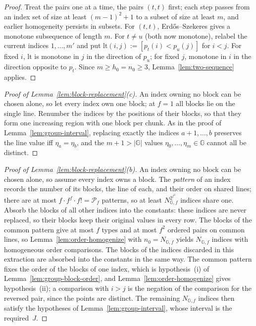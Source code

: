 \documentclass[11pt]{article}
\numberwithin{equation}{section}
\theoremstyle{plain}
\theoremstyle{definition}
\theoremstyle{remark}
\theoremstyle{plain}
\begin{document}
\begin{proof}
Treat the pairs one at a time, the pairs $(t,t)$ first; each step passes from an
index set of size at least $(m-1)^2+1$ to a subset of size at least $m$, and earlier
homogeneity persists in subsets.  For $(t,t)$, Erd\H{o}s--Szekeres gives a monotone
subsequence of length $m$.  For $t\ne u$ (both now monotone), relabel the current
indices $1,\ldots,m'$ and put $\mathrm{lt}(i,j):=[p_t(i)<p_u(j)]$ for $i<j$.  For fixed $i$,
$\mathrm{lt}$ is monotone in $j$ in the direction of $p_u$; for fixed $j$, monotone in $i$ in
the direction opposite to $p_t$.  Since $m\ge h_0=n_0\ge3$,
Lemma~\ref{lem:two-sequence} applies.
\end{proof}

\begin{proof}[Proof of Lemma~\ref{lem:block-replacement}\textup{(c)}]
An index owning no block can be chosen alone, so let every index own one block; at
$f=1$ all blocks lie on the single line.  Renumber the indices by the positions of
their blocks, so that they form one increasing region with one block per chunk.  As
in the proof of Lemma~\ref{lem:group-interval}, replacing exactly the indices
$a+1,\ldots,b$ preserves the line value iff $\eta_a=\eta_b$, and the $m+1>|{\mathbb G}|$
values $\eta_0,\ldots,\eta_m\in{\mathbb G}$ cannot all be distinct.
\end{proof}

\begin{proof}[Proof of Lemma~\ref{lem:block-replacement}\textup{(b)}]
An index owning no block can be chosen alone, so assume every index owns a block.
The \emph{pattern} of an index records the number of its blocks, the line of each,
and their order on shared lines; there are at most $f\cdot f^f\cdot f!=\mathcal P_f$
patterns, so at least $N_{{\mathbb G},f}^{2^{f^2}}$ indices share one.  Absorb the blocks of
all other indices into the constants: these indices are never replaced, so their
blocks keep their original values in every row.  The blocks of the common pattern
give at most $f$ types and at most $f^2$ ordered pairs on common lines, so
Lemma~\ref{lem:order-homogenize} with $n_0=N_{{\mathbb G},f}$ yields $N_{{\mathbb G},f}$
indices with homogeneous order comparisons.  The blocks of the indices discarded
in this extraction are absorbed into the constants in the same way.  The common
pattern fixes the order of the blocks of one index, which is hypothesis~(i) of
Lemma~\ref{lem:group-block-order}, and Lemma~\ref{lem:order-homogenize} gives
hypothesis~(ii); a comparison with $i>j$ is the negation of the comparison for the
reversed pair, since the points are distinct.  The remaining
$N_{{\mathbb G},f}$ indices then satisfy the hypotheses of
Lemma~\ref{lem:group-interval}, whose interval is the required~$J$.
\end{proof}
\end{document}
